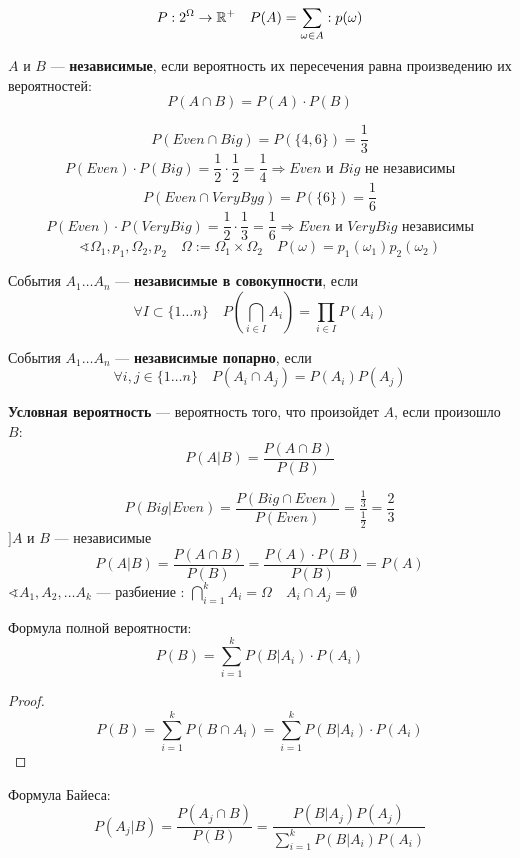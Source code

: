 $$P:2^\Omega \to \mathbb{R}^+ \quad P(A) = \sum\limits_{\omega \in A}: p(\omega)$$
\begin{definition}
    $A$ и $B$ --- \textbf{независимые}, если вероятность их пересечения равна произведению их вероятностей:
    $$P(A\cap B)=P(A)\cdot P(B)$$
\end{definition}
$$P(Even \cap Big) = P(\{4, 6\}) = \frac{1}{3}$$
$$P(Even) \cdot P(Big) = \frac{1}{2} \cdot \frac{1}{2} = \frac{1}{4} \Rightarrow Even \text{ и } Big \text{ не независимы}$$
$$P(Even \cap VeryByg) = P(\{6\}) = \frac{1}{6}$$
$$P(Even) \cdot P(VeryBig) = \frac{1}{2} \cdot \frac{1}{3} = \frac{1}{6} \Rightarrow Even \text{ и } VeryBig \text{ независимы}$$
$$\sphericalangle \Omega_1, p_1, \Omega_2, p_2 \quad \Omega := \Omega_1 \times \Omega_2 \quad P(\omega)=p_1(\omega_1)p_2(\omega_2)$$
\begin{definition}
    События $A_1\ldots A_n$ --- \textbf{независимые в совокупности}, если
    $$\forall I\subset\{1\ldots n\} \quad P\left(\bigcap\limits_{i\in I} A_i\right)=\prod\limits_{i\in I}P(A_i)$$
\end{definition}
\begin{definition}
    События $A_1\ldots A_n$ --- \textbf{независимые попарно}, если
    $$\forall i, j\in\{1\ldots n\} \quad P(A_i\cap A_j)=P(A_i)P(A_j)$$
\end{definition}
\begin{definition}
    \textbf{Условная вероятность} --- вероятность того, что произойдет $A$, если произошло $B$:
    $$P(A|B)=\frac{P(A\cap B)}{P(B)}$$
\end{definition}
$$P(Big|Even) = \frac{P(Big \cap Even)}{P(Even)} = \frac{\frac{1}{3}}{\frac{1}{2}} = \frac{2}{3}$$
$] A$ и $B$ --- независимые
$$P(A|B) = \frac{P(A \cap B)}{P(B)} = \frac{P(A)\cdot P(B)}{P(B)} = P(A)$$
$\sphericalangle A_1, A_2, \ldots A_k$ --- разбиение : $\bigcap\limits_{i=1}^k A_i=\Omega \quad A_i\cap A_j=\emptyset$
\begin{theorem}
    Формула полной вероятности:
    $$P(B)=\sum\limits_{i=1}^k P(B|A_i)\cdot P(A_i)$$
\end{theorem}
\begin{proof}
    $$P(B)=\sum\limits_{i=1}^k P(B\cap A_i)=\sum\limits_{i=1}^k P(B|A_i)\cdot P(A_i)$$
\end{proof}
\begin{theorem}
    Формула Байеса:
    $$P(A_j|B)=\frac{P(A_j\cap B)}{P(B)}=\frac{P(B|A_j)P(A_j)}{\sum\limits_{i=1}^k P(B|A_i)P(A_i)}$$
\end{theorem}

